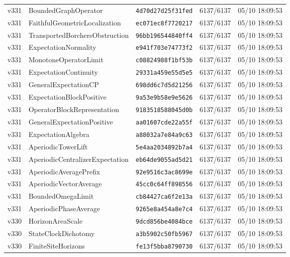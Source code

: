 \documentclass[11pt]{article}
\theoremstyle{definition}\newtheorem{deriv}{Derivação}
\begin{document}
{\begin{longtable}{@{}lllll@{}}
v331 & BoundedGraphOperator & \texttt{4d70d27d25f31fed} & 6137/6137 & 05/10 18:09:53 \\
v331 & FaithfulGeometricLocalization & \texttt{ec071ec8f7720217} & 6137/6137 & 05/10 18:09:53 \\
v331 & TransportedBorchersObstruction & \texttt{96bb196544840ff4} & 6137/6137 & 05/10 18:09:53 \\
v331 & ExpectationNormality & \texttt{e941f703e74773f2} & 6137/6137 & 05/10 18:09:53 \\
v331 & MonotoneOperatorLimit & \texttt{c08824988f1bf53b} & 6137/6137 & 05/10 18:09:53 \\
v331 & ExpectationContinuity & \texttt{29331a459e55d5e5} & 6137/6137 & 05/10 18:09:53 \\
v331 & GeneralExpectationCP & \texttt{698dd6c7d5d21256} & 6137/6137 & 05/10 18:09:53 \\
v331 & ExpectationBlockPositive & \texttt{9a53e9b58e9e5626} & 6137/6137 & 05/10 18:09:53 \\
v331 & OperatorBlockRepresentation & \texttt{9183518588045d0b} & 6137/6137 & 05/10 18:09:53 \\
v331 & GeneralExpectationPositive & \texttt{aa01607cde22a55f} & 6137/6137 & 05/10 18:09:53 \\
v331 & ExpectationAlgebra & \texttt{a88032a7e84a9c63} & 6137/6137 & 05/10 18:09:53 \\
v331 & AperiodicTowerLift & \texttt{5e4aa2034892b7a4} & 6137/6137 & 05/10 18:09:53 \\
v331 & AperiodicCentralizerExpectation & \texttt{eb64de9055ad5d21} & 6137/6137 & 05/10 18:09:53 \\
v331 & AperiodicAveragePrefix & \texttt{92e9516c3ac8699e} & 6137/6137 & 05/10 18:09:53 \\
v331 & AperiodicVectorAverage & \texttt{45cc0c64ff898556} & 6137/6137 & 05/10 18:09:53 \\
v331 & BoundedOmegaLimit & \texttt{cb84427ca6f2e13a} & 6137/6137 & 05/10 18:09:53 \\
v331 & AperiodicPhaseAverage & \texttt{9265e8a454a8e7c4} & 6137/6137 & 05/10 18:09:53 \\
v330 & HorizonAreaScale & \texttt{9dcd856be4084bce} & 6137/6137 & 05/10 18:09:53 \\
v330 & StateClockDichotomy & \texttt{a3b5902c50fb5967} & 6137/6137 & 05/10 18:09:53 \\
v330 & FiniteSiteHorizons & \texttt{fe13f5bba8790730} & 6137/6137 & 05/10 18:09:53 \\

\end{longtable}}
\end{document}
